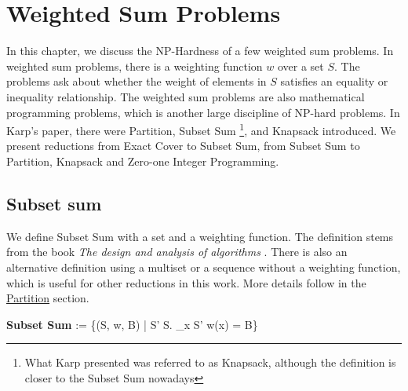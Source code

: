 \chapter{Weighted Sum Problems}\label{chapter:weighted}
In this chapter, we discuss the NP-Hardness of a few weighted sum problems. In weighted sum problems, 
there is a weighting function $w$ over a set $S$. The problems ask about whether the weight of elements 
in $S$ satisfies an equality or inequality relationship. The weighted sum problems are also mathematical programming 
problems, which is another large discipline of NP-hard problems. In Karp's paper, there were Partition, Subset Sum \footnote{What Karp presented was referred to as Knapsack, although
the definition is closer to the Subset Sum nowadays}, and Knapsack introduced. 
We present reductions from Exact Cover to Subset Sum, from Subset Sum to Partition, Knapsack and Zero-one Integer Programming. 

\section{Subset sum}
We define Subset Sum with a set and a weighting function. The definition stems from the book \textit{The design and analysis of algorithms} \cite{kozen1992design}.
There is also an alternative definition using a multiset or a sequence without 
a weighting function, which is useful for other reductions in this work. More details follow in the \hyperref[sec:partition]{Partition} section. 
\begin{myalign}
    \textbf{Subset Sum} := \{(S, w, B) | \exists S' \subseteq S. \sum_{x \in S'} w(x) = B\}
\end{myalign}

